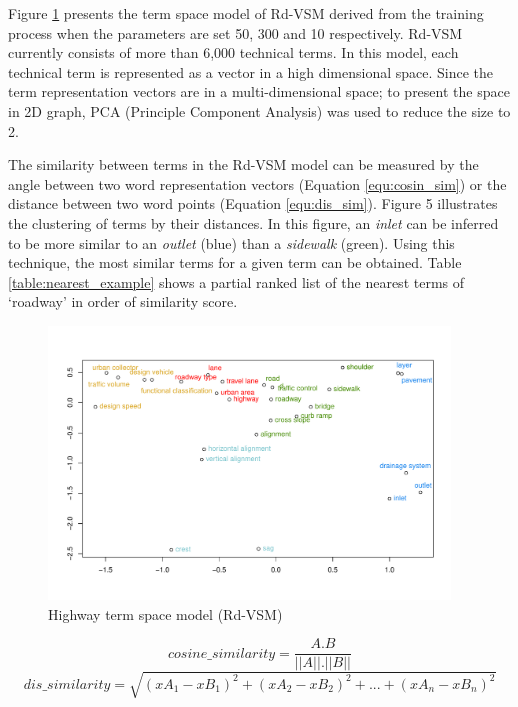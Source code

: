 \documentclass[Journal,InsideFigs, DoubleSpace]{ascelike} %
\begin{document}
%
\par
Figure \ref{fig:hvsm} presents the term space model of Rd-VSM derived from the training process when the parameters are set 50, 300 and 10 respectively. Rd-VSM currently consists of more than 6,000 technical terms. In this model, each technical term is represented as a vector in a high dimensional space. Since the term representation vectors are in a multi-dimensional space; to present the space in 2D graph, PCA (Principle Component Analysis) was used to reduce the size to 2.
\par
The similarity between terms in the Rd-VSM model can be measured by the angle between two word representation vectors (Equation \ref{equ:cosin_sim}) or the distance between two word points (Equation \ref{equ:dis_sim}). Figure 5 illustrates the clustering of terms by their distances. In this figure, an \textit{inlet} can be inferred to be more similar to an \textit{outlet} (blue) than a \textit{sidewalk} (green). Using this technique, the most similar terms for a given term can be obtained. Table \ref{table:nearest_example} shows a partial ranked list of the nearest terms of `roadway' in order of similarity score.
%
\begin{figure}[t]
	\centering
	\includegraphics[width=0.95\textwidth]{Figure5_hvsm_space}
	\caption{Highway term space model (Rd-VSM)}
	\label{fig:hvsm}
\end{figure}
%
\begin{equation}
\label{equ:cosin_sim}
cosine\_similarity = \frac{A.B}{||A||.||B||}
\end{equation}
%
\begin{equation}
\label{equ:dis_sim}
dis\_similarity =\sqrt{(xA_1-xB_1)^2+(xA_2-xB_2)^2+...+(xA_n-xB_n)^2}
\end{equation}
\end{document}

